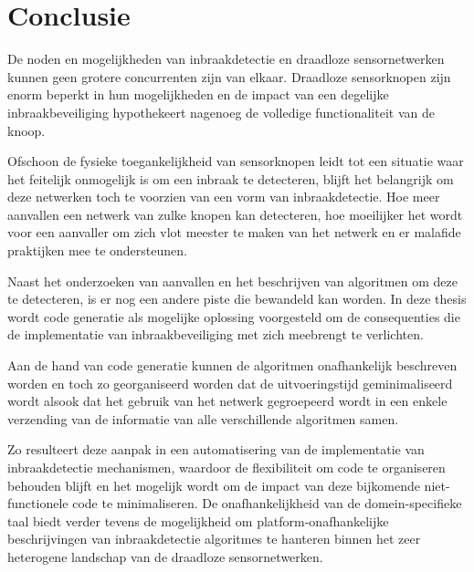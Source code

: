 \documentclass[12pt,a4paper,draft]{article}
\begin{document}
\section*{Conclusie}

De noden en mogelijkheden van inbraakdetectie en draadloze sensornetwerken
kunnen geen grotere concurrenten zijn van elkaar. Draadloze sensorknopen zijn
enorm beperkt in hun mogelijkheden en de impact van een degelijke
inbraakbeveiliging hypothekeert nagenoeg de volledige functionaliteit van de
knoop.

Ofschoon de fysieke toegankelijkheid van sensorknopen leidt tot een situatie
waar het feitelijk onmogelijk is om een inbraak te detecteren, blijft het
belangrijk om deze netwerken toch te voorzien van een vorm van inbraakdetectie.
Hoe meer aanvallen een netwerk van zulke knopen kan detecteren, hoe moeilijker
het wordt voor een aanvaller om zich vlot meester te maken van het netwerk en
er malafide praktijken mee te ondersteunen.

Naast het onderzoeken van aanvallen en het beschrijven van algoritmen om deze
te detecteren, is er nog een andere piste die bewandeld kan worden. In deze
thesis wordt code generatie als mogelijke oplossing voorgesteld om de
consequenties die de implementatie van inbraakbeveiliging met zich meebrengt te
verlichten.

Aan de hand van code generatie kunnen de algoritmen onafhankelijk beschreven
worden en toch zo georganiseerd worden dat de uitvoeringstijd geminimaliseerd
wordt alsook dat het gebruik van het netwerk gegroepeerd wordt in een enkele
verzending van de informatie van alle verschillende algoritmen samen.

Zo resulteert deze aanpak in een automatisering van de implementatie van
inbraakdetectie mechanismen, waardoor de flexibiliteit om code te organiseren
behouden blijft en het mogelijk wordt om de impact van deze bijkomende
niet-functionele code te minimaliseren. De onafhankelijkheid van de
domein-specifieke taal biedt verder tevens de mogelijkheid om
platform-onafhankelijke beschrijvingen van inbraakdetectie algoritmes te
hanteren binnen het zeer heterogene landschap van de draadloze sensornetwerken.
\end{document}
